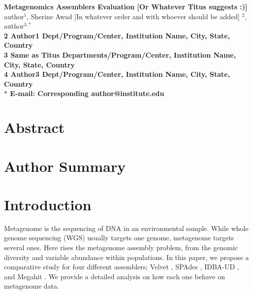 





\begin{flushleft}
{\Large
\textbf{Metagenomics Assemblers Evaluation [Or Whatever Titus suggests :)] }
}
\\
 
author$^{1}$, 
Sherine Awad [In whatever order and with whoever should be added] $^{2}$, 
author$^{3,\ast}$
\\
\bf{2} Author1  Dept/Program/Center, Institution Name, City, State, Country
\\
\bf{3} Same as Titus Departments/Program/Center, Institution Name, City, State, Country
\\
\bf{4} Author3 Dept/Program/Center, Institution Name, City, State, Country
\\
$\ast$ E-mail: Corresponding author@institute.edu
\end{flushleft}

\section*{Abstract}

\section*{Author Summary}



\section*{Introduction}

Metagenome is the sequencing of DNA in an environmental sample. While whole genome sequencing (WGS) usually targets one genome, metagenome targets several ones. Here rises the metagenome assembly problem, from the genomic diversity and variable abundance within populations. 
In this paper, we propose a comparative study for four different assemblers; Velvet \cite{velvet}, SPAdes \cite {spades}, IDBA-UD \cite{idba}, and Megahit \cite{megahit}.  We provide a detailed analysis on how each one behave on metagenome data. 


